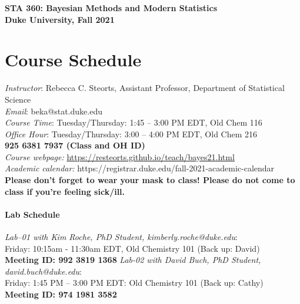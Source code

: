 \documentclass[11pt]{article}
\date{}
\begin{document}
\begin{center}
{\Large\bf STA 360: Bayesian Methods and Modern Statistics} \\

{\Large\bf Duke University, Fall 2021} \\
\end{center}


\section{Course Schedule}
\emph{Instructor}: Rebecca C. Steorts,  Assistant Professor,  Department of Statistical Science\\
\emph{Email}: beka@stat.duke.edu\\
\emph{Course Time}: Tuesday/Thursday: 1:45 -- 3:00 PM EDT, Old Chem 116 \\
\emph{Office Hour}: Tuesday/Thursday: 3:00 -- 4:00 PM EDT, Old Chem 216\\
\textbf{925 6381 7937 (Class and OH ID)}\\
\emph{Course webpage:} \url{https://resteorts.github.io/teach/bayes21.html} \\
\emph{Academic calendar:} https://registrar.duke.edu/fall-2021-academic-calendar \\
\textbf{Please don't forget to wear your mask to class! Please do not come to class if you're feeling sick/ill.}


\paragraph{Lab Schedule}
\emph{Lab--01 with Kim Roche, PhD Student, kimberly.roche@duke.edu}: \\Friday: 10:15am - 11:30am EDT, Old Chemistry 101 (Back up: David) \\
\textbf{Meeting ID: 992 3819 1368}
\emph{Lab-02 with David Buch, PhD Student, david.buch@duke.edu}: \\Friday: 1:45 PM -- 3:00 PM EDT: Old Chemistry 101 (Back up: Cathy) \\
\textbf{Meeting ID: 974 1981 3582}\\
\end{document}
